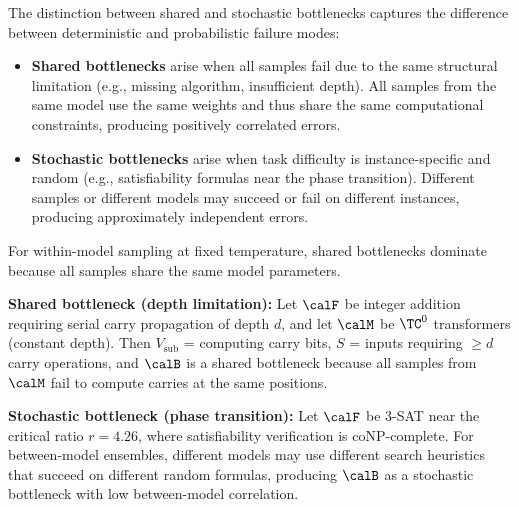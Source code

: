 \begin{remark}
The distinction between shared and stochastic bottlenecks captures the difference between deterministic and probabilistic failure modes:
\begin{itemize}
    \item \textbf{Shared bottlenecks} arise when all samples fail due to the same structural limitation (e.g., missing algorithm, insufficient depth). All samples from the same model use the same weights and thus share the same computational constraints, producing positively correlated errors.
    \item \textbf{Stochastic bottlenecks} arise when task difficulty is instance-specific and random (e.g., satisfiability formulas near the phase transition). Different samples or different models may succeed or fail on different instances, producing approximately independent errors.
\end{itemize}
For within-model sampling at fixed temperature, shared bottlenecks dominate because all samples share the same model parameters.
\end{remark}

\begin{example}
\textbf{Shared bottleneck (depth limitation):}
Let $\calF$ be integer addition requiring serial carry propagation of depth $d$, and let $\calM$ be $\TC^0$ transformers (constant depth).
Then $V_{\text{sub}}$ = computing carry bits, $S$ = inputs requiring $\geq d$ carry operations, and $\calB$ is a shared bottleneck because all samples from $\calM$ fail to compute carries at the same positions.

\textbf{Stochastic bottleneck (phase transition):}
Let $\calF$ be 3-SAT near the critical ratio $r = 4.26$, where satisfiability verification is coNP-complete.
For between-model ensembles, different models may use different search heuristics that succeed on different random formulas, producing $\calB$ as a stochastic bottleneck with low between-model correlation.
\end{example}


